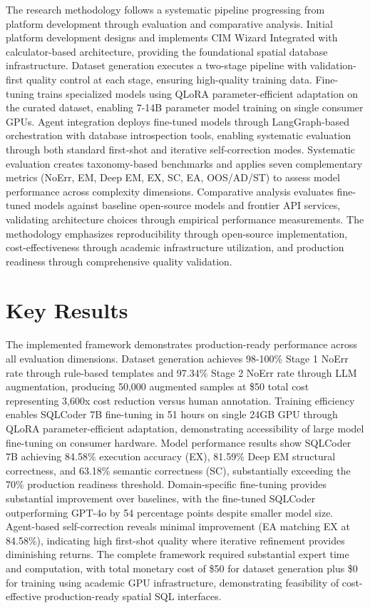 The research methodology follows a systematic pipeline progressing from platform development through evaluation and comparative analysis. Initial platform development designs and implements CIM Wizard Integrated with calculator-based architecture, providing the foundational spatial database infrastructure. Dataset generation executes a two-stage pipeline with validation-first quality control at each stage, ensuring high-quality training data. Fine-tuning trains specialized models using QLoRA parameter-efficient adaptation on the curated dataset, enabling 7-14B parameter model training on single consumer GPUs. Agent integration deploys fine-tuned models through LangGraph-based orchestration with database introspection tools, enabling systematic evaluation through both standard first-shot and iterative self-correction modes. Systematic evaluation creates taxonomy-based benchmarks and applies seven complementary metrics (NoErr, EM, Deep EM, EX, SC, EA, OOS/AD/ST) to assess model performance across complexity dimensions. Comparative analysis evaluates fine-tuned models against baseline open-source models and frontier API services, validating architecture choices through empirical performance measurements. The methodology emphasizes reproducibility through open-source implementation, cost-effectiveness through academic infrastructure utilization, and production readiness through comprehensive quality validation.

\section{Key Results}

The implemented framework demonstrates production-ready performance across all evaluation dimensions. Dataset generation achieves 98-100\% Stage 1 NoErr rate through rule-based templates and 97.34\% Stage 2 NoErr rate through LLM augmentation, producing 50,000 augmented samples at \$50 total cost representing 3,600x cost reduction versus human annotation. Training efficiency enables SQLCoder 7B fine-tuning in 51 hours on single 24GB GPU through QLoRA parameter-efficient adaptation, demonstrating accessibility of large model fine-tuning on consumer hardware. Model performance results show SQLCoder 7B achieving 84.58\% execution accuracy (EX), 81.59\% Deep EM structural correctness, and 63.18\% semantic correctness (SC), substantially exceeding the 70\% production readiness threshold. Domain-specific fine-tuning provides substantial improvement over baselines, with the fine-tuned SQLCoder outperforming GPT-4o by 54 percentage points despite smaller model size. Agent-based self-correction reveals minimal improvement (EA matching EX at 84.58\%), indicating high first-shot quality where iterative refinement provides diminishing returns. The complete framework required substantial expert time and computation, with total monetary cost of \$50 for dataset generation plus \$0 for training using academic GPU infrastructure, demonstrating feasibility of cost-effective production-ready spatial SQL interfaces.

